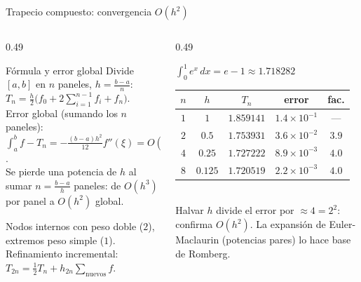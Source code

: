 \documentclass[aspectratio=169,10pt]{beamer}
\begin{document}
\begin{frame}{Trapecio compuesto: convergencia $O(h^2)$}
\begin{columns}[T]
\begin{column}{0.49\textwidth}
\begin{cardidea}{Fórmula y error global}{\faSuperscript}
{\footnotesize Divide $[a,b]$ en $n$ paneles, $h=\tfrac{b-a}{n}$:\\[0.5mm]
$\displaystyle T_n=\frac{h}{2}\Big(f_0+2\!\sum_{i=1}^{n-1}\!f_i+f_n\Big)$.\\[1.0mm]
Error global (sumando los $n$ paneles):\\[0.3mm]
$\displaystyle\int_a^b f-T_n=-\frac{(b-a)h^2}{12}f''(\xi)=O(h^2)$.\\[0.8mm]
Se pierde una potencia de $h$ al sumar $n=\tfrac{b-a}{h}$ paneles: de $O(h^3)$ por panel a $O(h^2)$ global.}
\end{cardidea}
\vspace{1mm}
\begin{cardnota}[\faInfoCircle]
{\footnotesize Nodos internos con peso doble ($2$), extremos peso simple ($1$). Refinamiento incremental: $T_{2n}=\tfrac12 T_n+h_{2n}\!\!\sum_{\text{nuevos}}\!\!f$.}
\end{cardnota}
\end{column}
\begin{column}{0.49\textwidth}
\begin{cardgear}{$\int_0^1 e^x\,dx=e-1\approx1.718282$}{\faTable}
\centering
{\footnotesize\renewcommand{\arraystretch}{1.3}\setlength{\tabcolsep}{6pt}
\begin{tabular}{c|c|c|cc}
$n$ & $h$ & $T_n$ & error & fac.\\\hline
$1$ & $1$ & $1.859141$ & $1.4{\times}10^{-1}$ & —\\
$2$ & $0.5$ & $1.753931$ & $3.6{\times}10^{-2}$ & $3.9$\\
$4$ & $0.25$ & $1.727222$ & $8.9{\times}10^{-3}$ & $4.0$\\
$8$ & $0.125$ & $1.720519$ & $2.2{\times}10^{-3}$ & $4.0$\\
\end{tabular}}\\[1.4mm]
{\footnotesize Halvar $h$ divide el error por $\approx4=2^2$: confirma $O(h^2)$. La expansión de Euler-Maclaurin (potencias pares) lo hace base de Romberg.}
\end{cardgear}
\end{column}
\end{columns}
\end{frame}
\end{document}
